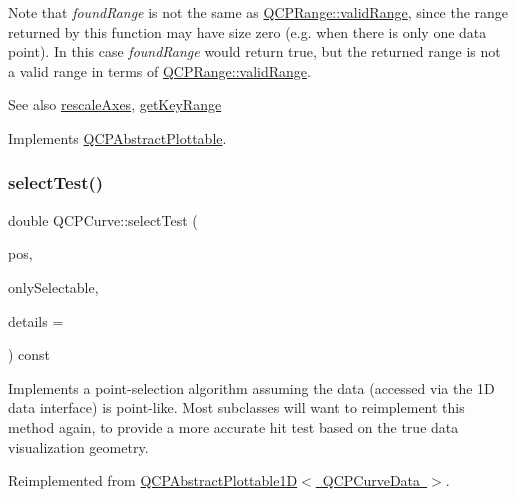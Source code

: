 Note that {\itshape found\+Range} is not the same as \mbox{\hyperlink{class_q_c_p_range_ab38bd4841c77c7bb86c9eea0f142dcc0}{Q\+C\+P\+Range\+::valid\+Range}}, since the range returned by this function may have size zero (e.\+g. when there is only one data point). In this case {\itshape found\+Range} would return true, but the returned range is not a valid range in terms of \mbox{\hyperlink{class_q_c_p_range_ab38bd4841c77c7bb86c9eea0f142dcc0}{Q\+C\+P\+Range\+::valid\+Range}}.

\begin{DoxySeeAlso}{See also}
\mbox{\hyperlink{class_q_c_p_abstract_plottable_a1491c4a606bccd2d09e65e11b79eb882}{rescale\+Axes}}, \mbox{\hyperlink{class_q_c_p_curve_a22d09087f78f254731197cc0b8783299}{get\+Key\+Range}} 
\end{DoxySeeAlso}


Implements \mbox{\hyperlink{class_q_c_p_abstract_plottable_a4de773988b21ed090fddd27c6a3a3dcb}{Q\+C\+P\+Abstract\+Plottable}}.

\mbox{\label{class_q_c_p_curve_a0ed9b7e6b4bc72010d6fcd974af46a8b}} 
\subsubsection{\texorpdfstring{select\+Test()}{selectTest()}}
{\footnotesize\ttfamily double Q\+C\+P\+Curve\+::select\+Test (\begin{DoxyParamCaption}\item[{const Q\+PointF \&}]{pos,  }\item[{bool}]{only\+Selectable,  }\item[{Q\+Variant $\ast$}]{details = {} }\end{DoxyParamCaption}) const\hspace{0.3cm}{\ttfamily [virtual]}}

Implements a point-\/selection algorithm assuming the data (accessed via the 1D data interface) is point-\/like. Most subclasses will want to reimplement this method again, to provide a more accurate hit test based on the true data visualization geometry.

Reimplemented from \mbox{\hyperlink{class_q_c_p_abstract_plottable1_d_a071e2df66ba1746067dfcb5e27947b43}{Q\+C\+P\+Abstract\+Plottable1\+D$<$ Q\+C\+P\+Curve\+Data $>$}}.

\mbox{\label{class_q_c_p_curve_a41246850d2e080bc57183ca19cd4135e}} 
